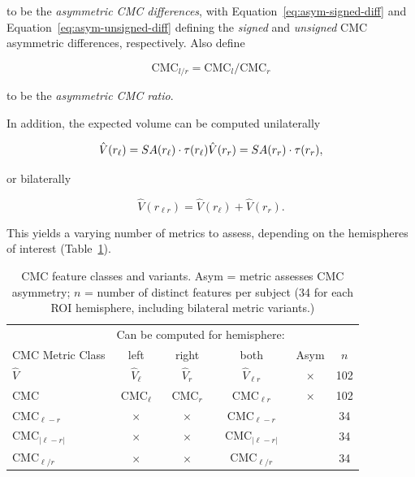 \documentclass{article}
\begin{document}
to be the \emph{asymmetric CMC differences}, with
Equation~\ref{eq:asym-signed-diff} and Equation~\ref{eq:asym-unsigned-diff}
defining the \emph{signed} and \emph{unsigned} CMC asymmetric differences,
respectively. Also define

\begin{equation} \label{eq:asym-ratio}
\text{CMC}_{l / r} = \text{CMC}_{l} / \text{CMC}_{r}
\end{equation}

to be the \emph{asymmetric CMC ratio}.

In addition, the expected volume
can be computed unilaterally

\begin{equation} \label{eq:ev-unilateral}
\hat{V}(r_{\ell}) = SA(r_{\ell}) \cdot \tau(r_{\ell}) \\
\hat{V}(r_r) = SA(r_r) \cdot \tau(r_r),
\end{equation}

or bilaterally

\begin{equation} \label{eq:ev-bilateral}
\hat{V}(r_{\ell r}) = \hat{V}(r_{\ell}) + \hat{V}(r_r).
\end{equation}

This yields a varying number of metrics to assess, depending on the
hemispheres of interest (Table~\ref{tab:cmc-variants}).

\begin{table}
\centering
\begin{tabular}{lccccc}
	\toprule

	                          &    \multicolumn{3}{c}{Can be computed for hemisphere:}  &       &      \\
  \cline{2-4}
	CMC Metric Class          &    left             &    right       & both             & Asym & $n$   \\
	\midrule
	$\hat{V}$                 & $\hat{V}_{\ell}$    & $\hat{V}_r$    & $\hat{V}_{\ell r}$        & $\times$   & 102 \\
	$\text{CMC}$              & $\text{CMC}_{\ell}$ & $\text{CMC}_r$ & $\text{CMC}_{\ell r}$     & $\times$   & 102 \\
	$\text{CMC}_{\ell - r}$   & $\times$            & $\times$       & $\text{CMC}_{\ell - r}$   & \checkmark &  34 \\
	$\text{CMC}_{|\ell - r|}$ & $\times$            & $\times$       & $\text{CMC}_{|\ell - r|}$ & \checkmark &  34 \\
	$\text{CMC}_{\ell / r}$   & $\times$            & $\times$       & $\text{CMC}_{\ell / r}$   & \checkmark &  34 \\
	\bottomrule
\end{tabular}
\footnotesize
\normalsize
\caption{CMC feature classes and variants. Asym = metric assesses CMC asymmetry; \(n\) = number of distinct features per subject (34 for each ROI hemisphere, including bilateral metric variants.)} \label{tab:cmc-variants}
\end{table}
\end{document}
